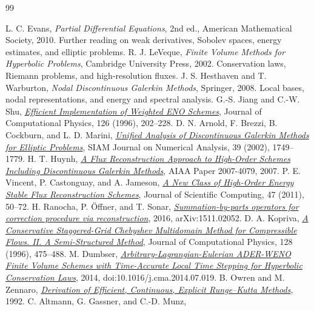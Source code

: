 \cleardoublepage
{}
{}
\begin{thebibliography}{99}
\raggedright
{}
L. C. Evans, \emph{Partial Differential Equations}, 2nd ed., American Mathematical Society, 2010.
Further reading on weak derivatives, Sobolev spaces, energy estimates, and elliptic problems.
R. J. LeVeque, \emph{Finite Volume Methods for Hyperbolic Problems}, Cambridge University Press, 2002.
Conservation laws, Riemann problems, and high-resolution fluxes.
J. S. Hesthaven and T. Warburton, \emph{Nodal Discontinuous Galerkin Methods}, Springer, 2008.
Local bases, nodal representations, and energy and spectral analysis.
G.-S. Jiang and C.-W. Shu,
\href{https://doi.org/10.1006/jcph.1996.0130}{\emph{Efficient Implementation of Weighted ENO Schemes}},
Journal of Computational Physics, 126 (1996), 202--228.
D. N. Arnold, F. Brezzi, B. Cockburn, and L. D. Marini,
\href{https://doi.org/10.1137/S0036142901384162}{\emph{Unified Analysis of Discontinuous Galerkin Methods for Elliptic Problems}},
SIAM Journal on Numerical Analysis, 39 (2002), 1749--1779.
H. T. Huynh,
\href{https://doi.org/10.2514/6.2007-4079}{\emph{A Flux Reconstruction Approach to High-Order Schemes Including Discontinuous Galerkin Methods}},
AIAA Paper 2007-4079, 2007.
P. E. Vincent, P. Castonguay, and A. Jameson,
\href{https://doi.org/10.1007/s10915-010-9420-z}{\emph{A New Class of High-Order Energy Stable Flux Reconstruction Schemes}},
Journal of Scientific Computing, 47 (2011), 50--72.
H. Ranocha, P. \"Offner, and T. Sonar,
\href{https://arxiv.org/abs/1511.02052}{\emph{Summation-by-parts operators for correction procedure via reconstruction}},
2016, arXiv:1511.02052.
D. A. Kopriva,
\href{https://doi.org/10.1006/jcph.1996.0225}{\emph{A Conservative Staggered-Grid Chebyshev Multidomain Method for Compressible Flows. II. A Semi-Structured Method}},
Journal of Computational Physics, 128 (1996), 475--488.
M. Dumbser,
\href{https://arxiv.org/abs/1402.6897}{\emph{Arbitrary-Lagrangian-Eulerian ADER-WENO Finite Volume Schemes with Time-Accurate Local Time Stepping for Hyperbolic Conservation Laws}},
2014, doi:10.1016/j.cma.2014.07.019.
B. Owren and M. Zennaro,
\href{https://doi.org/10.1137/0913084}{\emph{Derivation of Efficient, Continuous, Explicit Runge--Kutta Methods}}, 1992.
C. Altmann, G. Gassner, and C.-D. Munz,

\end{thebibliography}
